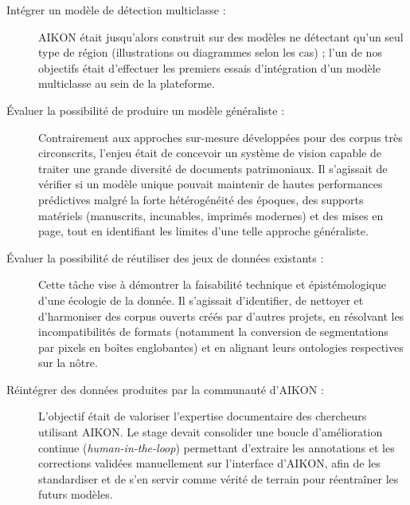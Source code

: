 \begin{description}
	\item[Intégrer un modèle de détection multiclasse :] AIKON était jusqu'alors construit sur des modèles ne détectant qu'un seul type de région (illustrations ou diagrammes selon les cas) ; l'un de nos objectifs était d'effectuer les premiers essais d'intégration d'un modèle multiclasse au sein de la plateforme.
	
	\item[Évaluer la possibilité de produire un modèle généraliste :] Contrairement aux approches sur-mesure développées pour des corpus très circonscrits, l'enjeu était de concevoir un système de vision capable de traiter une grande diversité de documents patrimoniaux. Il s'agissait de vérifier si un modèle unique pouvait maintenir de hautes performances prédictives malgré la forte hétérogénéité des époques, des supports matériels (manuscrits, incunables, imprimés modernes) et des mises en page, tout en identifiant les limites d'une telle approche généraliste.
	
	\item[Évaluer la possibilité de réutiliser des jeux de données existants :] Cette tâche vise à démontrer la faisabilité technique et épistémologique d'une écologie de la donnée. Il s'agissait d'identifier, de nettoyer et d'harmoniser des corpus ouverts créés par d'autres projets, en résolvant les incompatibilités de formats (notamment la conversion de segmentations par pixels en boîtes englobantes) et en alignant leurs ontologies respectives sur la nôtre.
	
	\item[Réintégrer des données produites par la communauté d'AIKON :] L'objectif était de valoriser l'expertise documentaire des chercheurs utilisant AIKON. Le stage devait consolider une boucle d'amélioration continue (\textit{human-in-the-loop}) permettant d'extraire les annotations et les corrections validées manuellement sur l'interface d'AIKON, afin de les standardiser et de s'en servir comme vérité de terrain pour réentraîner les futurs modèles.
\end{description}